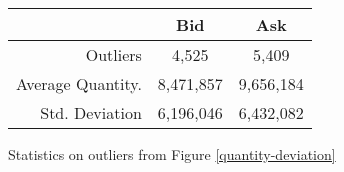 \begin{figure}
  \begin{center}
  \begin{tabular}{ r | c c }
    & \textbf{Bid} & \textbf{Ask}\\\hline
    Outliers & 4,525 & 5,409\\
    Average Quantity. & 8,471,857 & 9,656,184 \\
    Std. Deviation & 6,196,046 & 6,432,082 \\
  \end{tabular}
  \end{center}
  \caption{Statistics on outliers from Figure \ref{quantity-deviation}}
  \label{quantity-deviation-table}
\end{figure}

